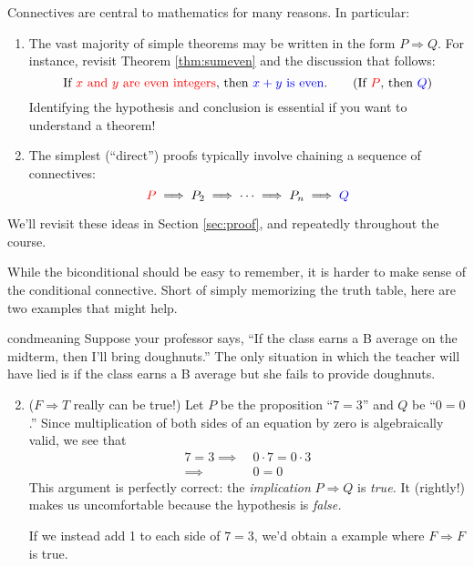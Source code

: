 Connectives are central to mathematics for many reasons. In particular:
\begin{enumerate}
  \item The vast majority of simple theorems may be written in the form $P\Longrightarrow Q$. For instance, revisit Theorem \ref{thm:sumeven} and the discussion that follows:
  \[
  	\text{If \textcolor{red}{$x$ and $y$ are even integers}, then \textcolor{blue}{$x+y$ is even}.} \tag{If \textcolor{red}{$P$}, then \textcolor{blue}{$Q$}}
  \]
  Identifying the hypothesis and conclusion is essential if you want to understand a theorem!
  \item The simplest (``direct'') proofs typically involve chaining a sequence of connectives:
  \[
  	\textcolor{red}{P}\implies P_2\implies \cdots \implies P_n\implies \textcolor{blue}{Q}
  \]
\end{enumerate}
We'll revisit these ideas in Section \ref{sec:proof}, and repeatedly throughout the course.
\bigbreak


While the biconditional should be easy to remember, it is harder to make sense of the conditional connective. Short of simply memorizing the truth table, here are two examples that might help.

\begin{examples}{}{condmeaning}
	\exstart Suppose your professor says, ``If the class earns a B average on the midterm, then I'll bring doughnuts.'' The only situation in which the teacher will have lied is if the class earns a B average but she fails to provide doughnuts.
	\begin{enumerate}\setcounter{enumi}{1}
	  \item ($F\Longrightarrow T$ really can be true!) Let $P$ be the proposition ``$7=3$'' and $Q$ be ``$0=0$.'' Since multiplication of both sides of an equation by zero is algebraically valid, we see that
	  \begin{align*}
			7=3\implies\ &0\cdot 7=0\cdot 3\tag*{(If $7=3$, then 0 times 7 equals 0 times 3)}\\
			\implies\ &0=0\tag*{(then 0 equals 0)}
		\end{align*}
	  This argument is perfectly correct: the \emph{implication} $P\Longrightarrow Q$ is \emph{true.} It (rightly!) makes us uncomfortable because the hypothesis is \emph{false.}\par
	  If we instead add 1 to each side of $7=3$, we'd obtain a example where $F\Longrightarrow F$ is true.
	\end{enumerate}
\end{examples}


